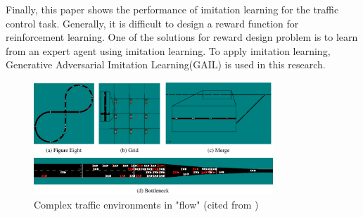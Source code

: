 Finally, this paper shows the performance of imitation learning for the traffic control task. Generally, it is difficult to design a reward function for reinforcement learning. One of the solutions for reward design problem is to learn from an expert agent using imitation learning. To apply imitation learning, Generative Adversarial Imitation Learning(GAIL)\cite{Ho} is used in this research.

\begin{figure}[]
    \begin{center}
    \includegraphics[width=9cm]{img/envs.eps}
    \caption{Complex traffic environments in "flow" (cited from \cite{Vinitsky2018})}
    \label{fig:envs}
    \end{center}
\end{figure}
